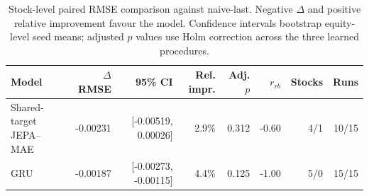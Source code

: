 \begin{table}[t]
\centering
\small
\caption{Stock-level paired RMSE comparison against naive-last. Negative $\Delta$ and positive relative improvement favour the model. Confidence intervals bootstrap equity-level seed means; adjusted $p$ values use Holm correction across the three learned procedures.}
\label{tab:paired_rmse_naive}
\begin{tabular}{lrrrrrrr}
\toprule
Model & $\Delta$RMSE & 95\% CI & Rel. impr. & Adj. $p$ & $r_{rb}$ & Stocks & Runs \\
\midrule
Shared-target JEPA--MAE & -0.00231 & [-0.00519, 0.00026] & 2.9\% & 0.312 & -0.60 & 4/1 & 10/15 \\
GRU & -0.00187 & [-0.00273, -0.00115] & 4.4\% & 0.125 & -1.00 & 5/0 & 15/15 \\
\bottomrule
\end{tabular}
\end{table}
